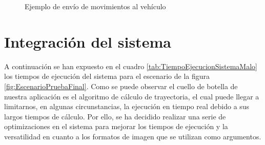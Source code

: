 \begin{figure}[htbp]
 \centering
 \caption{Ejemplo de envío de movimientos al vehículo}
 \label{fig:Coordinador}
\end{figure}

\section{Integración del sistema}

A continuación se han expuesto en el cuadro \ref{tab:TiempoEjecucionSistemaMalo} los tiempos de ejecución del sistema para el escenario de la figura \ref{fig:EscenarioPruebaFinal}. Como se puede observar el cuello de botella de nuestra aplicación es el algoritmo de cálculo de trayectoria, el cual puede llegar a limitarnos, en algunas circunstancias, la ejecución en tiempo real debido a sus largos tiempos de cálculo. Por ello, se ha decidido realizar una serie de optimizaciones en el sistema para mejorar los tiempos de ejecución y la versatilidad en cuanto a los formatos de imagen que se utilizan como argumentos.


